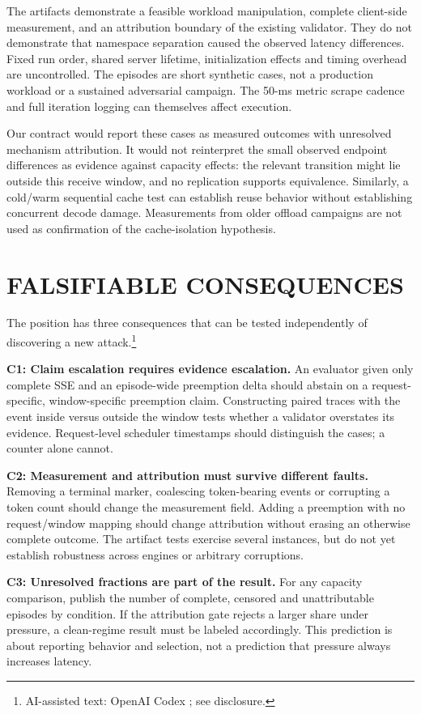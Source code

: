 \documentclass[a4paper,twoside]{article}
\newcommand{\aicite}{\footnote{AI-assisted text: OpenAI Codex \cite{codex}; see disclosure.}}
\begin{document}
The artifacts demonstrate a feasible workload manipulation, complete client-side measurement, and an attribution boundary of the existing validator. They do not demonstrate that namespace separation caused the observed latency differences. Fixed run order, shared server lifetime, initialization effects and timing overhead are uncontrolled. The episodes are short synthetic cases, not a production workload or a sustained adversarial campaign. The 50-ms metric scrape cadence and full iteration logging can themselves affect execution.

Our contract would report these cases as measured outcomes with unresolved mechanism attribution. It would not reinterpret the small observed endpoint differences as evidence against capacity effects: the relevant transition might lie outside this receive window, and no replication supports equivalence. Similarly, a cold/warm sequential cache test can establish reuse behavior without establishing concurrent decode damage. Measurements from older offload campaigns are not used as confirmation of the cache-isolation hypothesis.

\section{\uppercase{Falsifiable Consequences}}

The position has three consequences that can be tested independently of discovering a new attack.\aicite

\textbf{C1: Claim escalation requires evidence escalation.} An evaluator given only complete SSE and an episode-wide preemption delta should abstain on a request-specific, window-specific preemption claim. Constructing paired traces with the event inside versus outside the window tests whether a validator overstates its evidence. Request-level scheduler timestamps should distinguish the cases; a counter alone cannot.

\textbf{C2: Measurement and attribution must survive different faults.} Removing a terminal marker, coalescing token-bearing events or corrupting a token count should change the measurement field. Adding a preemption with no request/window mapping should change attribution without erasing an otherwise complete outcome. The artifact tests exercise several instances, but do not yet establish robustness across engines or arbitrary corruptions.

\textbf{C3: Unresolved fractions are part of the result.} For any capacity comparison, publish the number of complete, censored and unattributable episodes by condition. If the attribution gate rejects a larger share under pressure, a clean-regime result must be labeled accordingly. This prediction is about reporting behavior and selection, not a prediction that pressure always increases latency.
\end{document}

